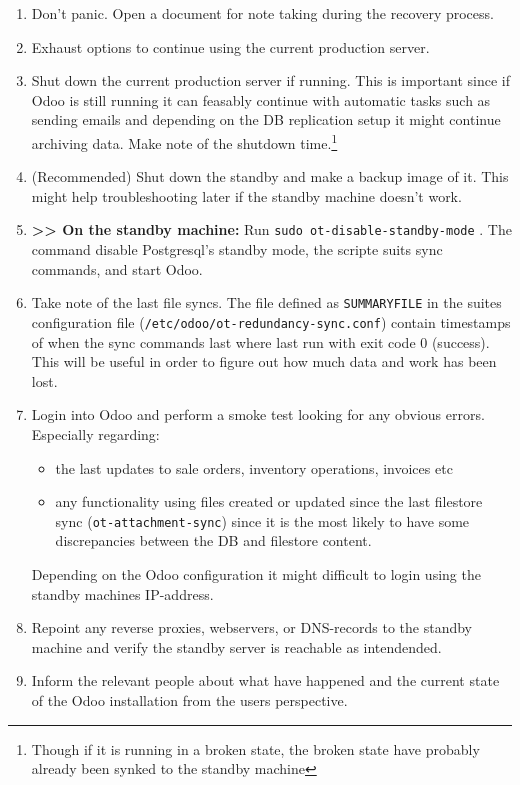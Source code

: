 \documentclass[a4paper]{article}
\begin{document}
	\begin{enumerate}
		\item Don't panic. Open a document for note taking during the recovery process.
		\item Exhaust options to continue using the current production server.
		\item Shut down the current production server if running. This is important since if Odoo is still running it can feasably continue with automatic tasks such as sending emails and depending on the DB replication setup it might continue archiving data. Make note of the shutdown time.\footnote{Though if it is running in a broken state, the broken state have probably already been synked to the standby machine}
		\item (Recommended) Shut down the standby and make a backup image of it. This might help troubleshooting later if the standby machine doesn't work.
		\item \textbf{>> On the standby machine:} Run \texttt{sudo ot-disable-standby-mode} . The command disable Postgresql's standby mode, the scripte suits sync commands, and start Odoo.
		\item Take note of the last file syncs. The file defined as \texttt{SUMMARYFILE} in the suites configuration file (\texttt{/etc/odoo/ot-redundancy-sync.conf}) contain timestamps of when the sync commands last where last run with exit code 0 (success). This will be useful in order to figure out how much data and work has been lost.
		\item Login into Odoo and perform a smoke test looking for any obvious errors. Especially regarding:
		\begin{itemize}
			\item the last updates to sale orders, inventory operations, invoices etc
			\item any functionality using files created or updated since the last filestore sync (\texttt{ot-attachment-sync}) since it is the most likely to have some discrepancies between the DB and filestore content.
		\end{itemize}
		Depending on the Odoo configuration it might difficult to login using the standby machines IP-address. 
		\item Repoint any reverse proxies, webservers, or DNS-records to the standby machine and verify the standby server is reachable as intendended.
		\item Inform the relevant people about what have happened and the current state of the Odoo installation from the users perspective.
	\end{enumerate}
	
\end{document}
